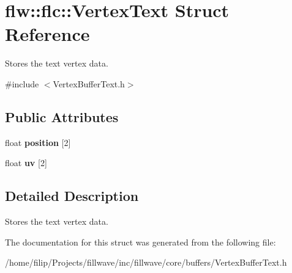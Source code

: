 \hypertarget{structflw_1_1flc_1_1VertexText}{}\section{flw\+:\+:flc\+:\+:Vertex\+Text Struct Reference}
\label{structflw_1_1flc_1_1VertexText}


Stores the text vertex data.  




{\ttfamily \#include $<$Vertex\+Buffer\+Text.\+h$>$}

\subsection*{Public Attributes}
\begin{DoxyCompactItemize}
\item 
float {\bfseries position} \mbox{[}2\mbox{]}\hypertarget{structflw_1_1flc_1_1VertexText_a7026b7d1996f16408b724231846eccb2}{}\label{structflw_1_1flc_1_1VertexText_a7026b7d1996f16408b724231846eccb2}

\item 
float {\bfseries uv} \mbox{[}2\mbox{]}\hypertarget{structflw_1_1flc_1_1VertexText_a0b0f1d71f1c2301c2e0d3238062c1981}{}\label{structflw_1_1flc_1_1VertexText_a0b0f1d71f1c2301c2e0d3238062c1981}

\end{DoxyCompactItemize}


\subsection{Detailed Description}
Stores the text vertex data. 

The documentation for this struct was generated from the following file\+:\begin{DoxyCompactItemize}
\item 
/home/filip/\+Projects/fillwave/inc/fillwave/core/buffers/Vertex\+Buffer\+Text.\+h\end{DoxyCompactItemize}
